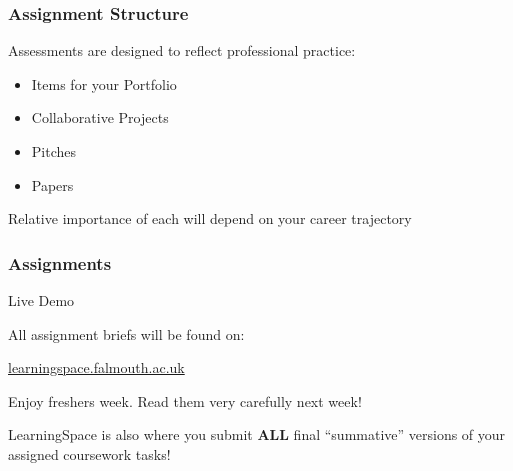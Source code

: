 \begin{frame}
	\frametitle{Assignment Structure}
	
	
	Assessments are designed to reflect professional practice:
	
	\begin{itemize}
		\item Items for your Portfolio
		\item Collaborative Projects
		\item Pitches
		\item Papers
	\end{itemize}

	Relative importance of each will depend on your career trajectory

\end{frame}











\begin{frame}
	\frametitle{Assignments}
	
	Live Demo
	
	\vspace{3em}
	
	All assignment briefs will be found on:
	
	\vspace{0.5em}
	
	\indent \url{learningspace.falmouth.ac.uk}
	
	\vspace{0.5em}
	
	Enjoy freshers week. Read them very carefully next week!
	
	\vspace{0.5em}
	
	LearningSpace is also where you submit \textbf{ALL} final ``summative'' versions of your assigned coursework tasks!
	
\end{frame}

